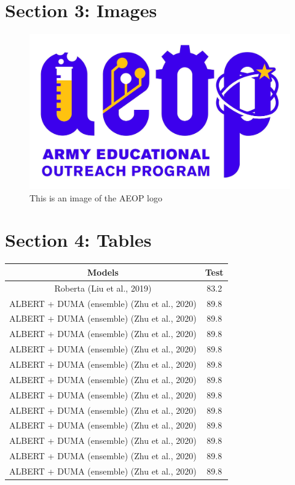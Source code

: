 \documentclass[12pt]{article}
\begin{document}
\newpage

\section{Section 3: Images}

\begin{figure}[!h]
    \centering
    \includegraphics[scale=0.2]{AEOP_Logo.jpeg}
    \caption{This is an image of the AEOP logo}
    \label{fig:my_label}
\end{figure}



\section{Section 4: Tables}

\begin{center}
 \begin{tabular}{c c} %
 \hline
 Models & Test \\ [0.5ex] 
 \hline  %
 Roberta (Liu et al., 2019) & 83.2  \\ 
 ALBERT + DUMA (ensemble) (Zhu et al., 2020) & 89.8  \\
 ALBERT + DUMA (ensemble) (Zhu et al., 2020) & 89.8  \\
 ALBERT + DUMA (ensemble) (Zhu et al., 2020) & 89.8  \\
 ALBERT + DUMA (ensemble) (Zhu et al., 2020) & 89.8  \\
 ALBERT + DUMA (ensemble) (Zhu et al., 2020) & 89.8  \\
 ALBERT + DUMA (ensemble) (Zhu et al., 2020) & 89.8  \\ [1ex] 
 \hline
 ALBERT + DUMA (ensemble) (Zhu et al., 2020) & 89.8  \\ 
 ALBERT + DUMA (ensemble) (Zhu et al., 2020) & 89.8  \\
 ALBERT + DUMA (ensemble) (Zhu et al., 2020) & 89.8  \\
 ALBERT + DUMA (ensemble) (Zhu et al., 2020) & 89.8 \\
 ALBERT + DUMA (ensemble) (Zhu et al., 2020) & 89.8  \\
 ALBERT + DUMA (ensemble) (Zhu et al., 2020) & 89.8  \\ [1ex] 
 \hline
\end{tabular}
\end{center}
\end{document}
